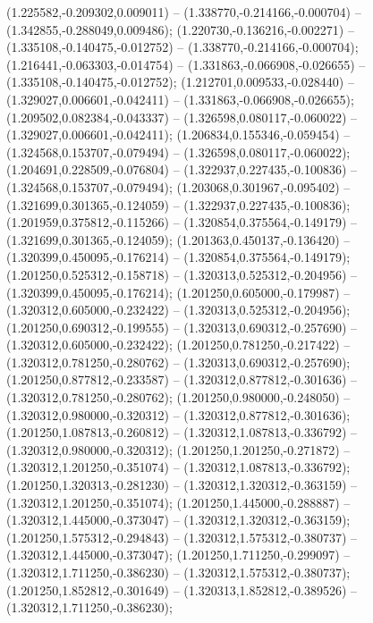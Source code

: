  (1.225582,-0.209302,0.009011) -- (1.338770,-0.214166,-0.000704) -- (1.342855,-0.288049,0.009486);
 (1.220730,-0.136216,-0.002271) -- (1.335108,-0.140475,-0.012752) -- (1.338770,-0.214166,-0.000704);
 (1.216441,-0.063303,-0.014754) -- (1.331863,-0.066908,-0.026655) -- (1.335108,-0.140475,-0.012752);
 (1.212701,0.009533,-0.028440) -- (1.329027,0.006601,-0.042411) -- (1.331863,-0.066908,-0.026655);
 (1.209502,0.082384,-0.043337) -- (1.326598,0.080117,-0.060022) -- (1.329027,0.006601,-0.042411);
 (1.206834,0.155346,-0.059454) -- (1.324568,0.153707,-0.079494) -- (1.326598,0.080117,-0.060022);
 (1.204691,0.228509,-0.076804) -- (1.322937,0.227435,-0.100836) -- (1.324568,0.153707,-0.079494);
 (1.203068,0.301967,-0.095402) -- (1.321699,0.301365,-0.124059) -- (1.322937,0.227435,-0.100836);
 (1.201959,0.375812,-0.115266) -- (1.320854,0.375564,-0.149179) -- (1.321699,0.301365,-0.124059);
 (1.201363,0.450137,-0.136420) -- (1.320399,0.450095,-0.176214) -- (1.320854,0.375564,-0.149179);
 (1.201250,0.525312,-0.158718) -- (1.320313,0.525312,-0.204956) -- (1.320399,0.450095,-0.176214);
 (1.201250,0.605000,-0.179987) -- (1.320312,0.605000,-0.232422) -- (1.320313,0.525312,-0.204956);
 (1.201250,0.690312,-0.199555) -- (1.320313,0.690312,-0.257690) -- (1.320312,0.605000,-0.232422);
 (1.201250,0.781250,-0.217422) -- (1.320312,0.781250,-0.280762) -- (1.320313,0.690312,-0.257690);
 (1.201250,0.877812,-0.233587) -- (1.320312,0.877812,-0.301636) -- (1.320312,0.781250,-0.280762);
 (1.201250,0.980000,-0.248050) -- (1.320312,0.980000,-0.320312) -- (1.320312,0.877812,-0.301636);
 (1.201250,1.087813,-0.260812) -- (1.320312,1.087813,-0.336792) -- (1.320312,0.980000,-0.320312);
 (1.201250,1.201250,-0.271872) -- (1.320312,1.201250,-0.351074) -- (1.320312,1.087813,-0.336792);
 (1.201250,1.320313,-0.281230) -- (1.320312,1.320312,-0.363159) -- (1.320312,1.201250,-0.351074);
 (1.201250,1.445000,-0.288887) -- (1.320312,1.445000,-0.373047) -- (1.320312,1.320312,-0.363159);
 (1.201250,1.575312,-0.294843) -- (1.320312,1.575312,-0.380737) -- (1.320312,1.445000,-0.373047);
 (1.201250,1.711250,-0.299097) -- (1.320312,1.711250,-0.386230) -- (1.320312,1.575312,-0.380737);
 (1.201250,1.852812,-0.301649) -- (1.320313,1.852812,-0.389526) -- (1.320312,1.711250,-0.386230);
